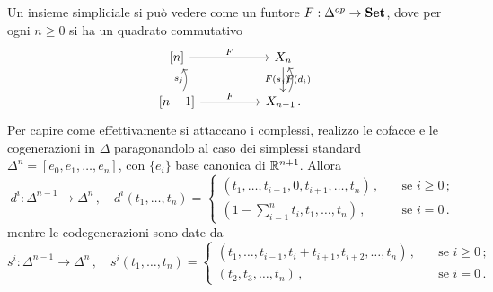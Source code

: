 Un insieme simpliciale si può vedere come un funtore
$F: \Delta^{op} \to {\normalfont\textbf{Set}}$, dove per ogni $n \ge 0$ si ha un quadrato commutativo
\begin{equation*}
	\begin{tikzcd}
		{[n]} \ar[rr, "F"] & & X_{n} \ar[d, "F(d_{i})"] \\
		{[n-1]} \ar[rr, "F"] \ar[u, bend right, "s_{j}"] & & X_{n-1} \ar[u, bend right, "F(s_{j})"]\,.
	\end{tikzcd}
\end{equation*}
Per capire come effettivamente si attaccano i complessi,
realizzo le cofacce e le cogenerazioni in $\Delta$ 
paragonandolo al caso dei simplessi standard $\Delta^{n} = [e_{0}, e_{1}, \dots, e_{n}]$,
con $\{e_{i}\}$ base canonica di ${\mathbb R}^{n+1}$. Allora
\begin{equation*}
	d^{i}: \Delta^{n-1} \longrightarrow \Delta^{n}\,,
	\quad d^{i}(t_{1}, \dots, t_{n}) =
	\begin{cases}
		(t_{1}, \dots, t_{i-1}, 0, t_{i+1}, \dots, t_{n})\,, \quad &\text{se } i \ge 0\,; \\
		\left(1-\sum_{i=1}^{n} t_{i}, t_{1},  \dots , t_{n} \right)\,, \quad &\text{se } i = 0\,.
	\end{cases}
\end{equation*}
mentre le codegenerazioni sono date da
\begin{equation*}
	s^{i}: \Delta^{n-1} \longrightarrow \Delta^{n}\,,
	\quad s^{i}(t_{1}, \dots, t_{n}) =
	\begin{cases}
		(t_{1}, \dots, t_{i-1}, t_{i}+t_{i+1}, t_{i+2}, \dots, t_{n})\,, \quad &\text{se } i \ge 0\,; \\
		\left(t_{2}, t_{3},  \dots , t_{n} \right)\,, \quad &\text{se } i = 0\,.
	\end{cases}
\end{equation*}

